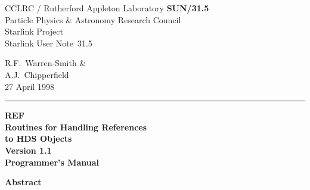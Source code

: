 \documentclass[twoside,11pt]{article}
\newcommand{\stardoccategory}  {Starlink User Note}
\newcommand{\stardocinitials}  {SUN}
\newcommand{\stardocnumber}    {31.5}
\newcommand{\stardocauthors}   {R.F.~Warren-Smith \& \\
                                A.J.~Chipperfield}
\newcommand{\stardocdate}      {27 April 1998}
\newcommand{\stardoctitle}     {REF \\ [1ex]
                                Routines for Handling References\\
                                to HDS Objects}
\newcommand{\stardocversion}   {Version 1.1}
\newcommand{\stardocmanual}    {Programmer's Manual}
\newcommand{\stardocname}{\stardocinitials /\stardocnumber}
\newenvironment{latexonly}{}{}
\begin{document}
\thispagestyle{empty}

\begin{latexonly}
   CCLRC / {\sc Rutherford Appleton Laboratory} \hfill {\bf \stardocname}\\
   {\large Particle Physics \& Astronomy Research Council}\\
   {\large Starlink Project\\}
   {\large \stardoccategory\ \stardocnumber}
   \begin{flushright}
   \stardocauthors\\
   \stardocdate
   \end{flushright}
   \vspace{-4mm}
   \rule{\textwidth}{0.5mm}
   \vspace{5mm}
   \begin{center}
   {\Huge\bf  \stardoctitle \\ [2.5ex]}
   {\LARGE\bf \stardocversion \\ [4ex]}
   {\Huge\bf  \stardocmanual}
   \end{center}
   \vspace{5mm}


   \vspace{10mm}
   \begin{center}
      {\Large\bf Abstract}
   \end{center}
\end{latexonly}
\end{document}
